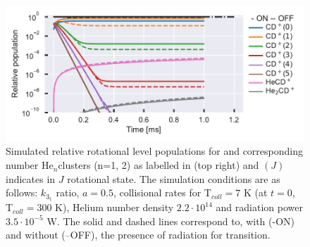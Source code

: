 \begin{figure}
    \centering
    \includegraphics[width=1\textwidth]{figures/simulations/coll_rad_att/CD+_He_f-time__transition_0-1_0.001s_population_ratio.pdf}
    \caption{Simulated relative rotational level populations for \CD and corresponding number He$_n$\CD clusters (n=1, 2) as labelled in (top right) and \CD$(J)$ indicates \CD in $J$ rotational state. The simulation conditions are as follows: $k_{3_1}$ ratio, $a=0.5$, collisional rates for T$_{coll}=7$ K  (at $t=0$, T$_{coll}=300$ K), Helium number density $2.2 \cdot 10^{14}$ \percc and radiation power $3.5\cdot10^{-5}$ W. The solid and dashed lines correspond to, with (-ON) and without (--OFF), the presence of radiation for \CD \CDline transition.}
    \label{fig:thz-sim:rel-pop:1ms}
\end{figure}